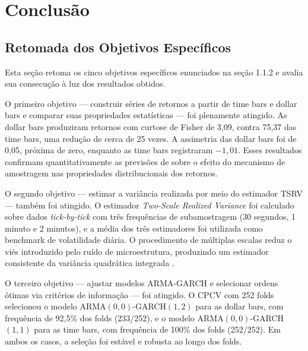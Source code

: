 
\chapter{Conclusão}
\label{cap:conclusao}

\section{Retomada dos Objetivos Específicos}
\label{sec:retomada_objetivos}

Esta seção retoma os cinco objetivos específicos enunciados na seção 1.1.2 e avalia
sua consecução à luz dos resultados obtidos.

O primeiro objetivo — construir séries de retornos a partir de time bars e dollar bars
e comparar suas propriedades estatísticas — foi plenamente atingido. As dollar bars
produziram retornos com curtose de Fisher de 3,09, contra 75,37 das time bars, uma
redução de cerca de 25 vezes. A assimetria das dollar bars foi de 0,05, próxima de zero,
enquanto as time bars registraram $-1{,}01$. Esses resultados confirmam quantitativamente
as previsões de  sobre o efeito do mecanismo de amostragem nas
propriedades distribucionais dos retornos.

O segundo objetivo — estimar a variância realizada por meio do estimador TSRV — também
foi atingido. O estimador \textit{Two-Scale Realized Variance} foi calculado sobre dados
\textit{tick-by-tick} com três frequências de subamostragem (30 segundos, 1 minuto e
2 minutos), e a média dos três estimadores foi utilizada como benchmark de volatilidade
diária. O procedimento de múltiplas escalas reduz o viés introduzido pelo ruído de
microestrutura, produzindo um estimador consistente da variância quadrática integrada
\cite{zhang2005}.

O terceiro objetivo — ajustar modelos ARMA-GARCH e selecionar ordens ótimas via critérios
de informação — foi atingido. O CPCV com 252 folds selecionou o modelo ARMA$(0,0)$-GARCH$(1,2)$
para as dollar bars, com frequência de 92,5\% dos folds (233/252), e o modelo
ARMA$(0,0)$-GARCH$(1,1)$ para as time bars, com frequência de 100\% dos folds (252/252).
Em ambos os casos, a seleção foi estável e robusta ao longo dos folds.

